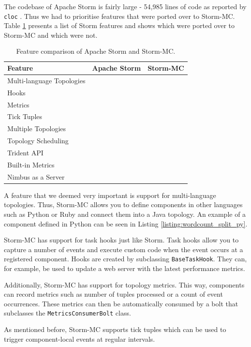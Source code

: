 \documentclass[bsc,logo,frontabs,twoside,singlespacing,normalheadings,parskip]{infthesis}\usepackage[]{graphicx}\usepackage[]{color}
\newcommand{\cmark}{\ding{51}}\newcommand{\xmark}{\ding{55}}
\begin{document}
The codebase of Apache Storm is fairly large - 54,985 lines of code as reported by \texttt{cloc} \citep{Cloc}. Thus we had to prioritise features that were ported over to Storm-MC. Table \ref{table:features} presents a list of Storm features and shows which were ported over to Storm-MC and which were not.

\begin{table}[htb!]
\centering
\small
\begin{tabular}{@{}lcc@{}}
    \textbf{Feature} & \textbf{Apache Storm} & \textbf{Storm-MC} \\ \toprule
    Multi-language Topologies & \cmark & \cmark \\
    Hooks & \cmark & \cmark \\
    Metrics & \cmark & \cmark \\
    Tick Tuples & \cmark & \cmark \\
    Multiple Topologies & \cmark & \xmark \\
    Topology Scheduling & \cmark & \xmark \\
	Trident API & \cmark & \xmark \\
    Built-in Metrics & \cmark & \xmark \\
    Nimbus as a Server & \cmark & \xmark \\
\end{tabular}
\caption{Feature comparison of Apache Storm and Storm-MC.}
\label{table:features}
\end{table}

A feature that we deemed very important is support for multi-language topologies. Thus, Storm-MC allows you to define components in other languages such as Python or Ruby and connect them into a Java topology. An example of a component defined in Python can be seen in Listing \ref{listing:wordcount_split_py}.

Storm-MC has support for task hooks just like Storm. Task hooks allow you to capture a number of events and execute custom code when the event occurs at a registered component. Hooks are created by subclassing \texttt{BaseTaskHook}. They can, for example, be used to update a web server with the latest performance metrics.

Additionally, Storm-MC has support for topology metrics. This way, components can record metrics such as number of tuples processed or a count of event occurrences. These metrics can then be automatically consumed by a bolt that subclasses the \texttt{MetricsConsumerBolt} class.

As mentioned before, Storm-MC supports tick tuples which can be used  to trigger component-local events at regular intervals.
\end{document}
